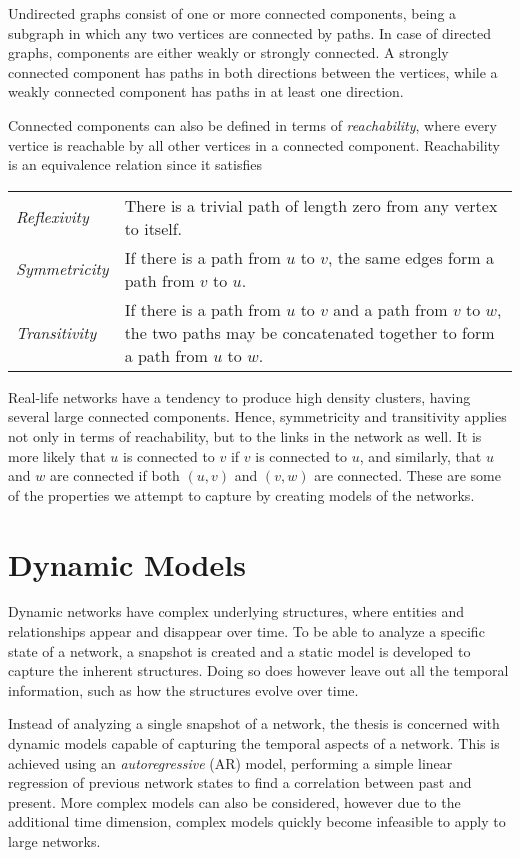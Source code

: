     Undirected graphs consist of one or more connected components, being a subgraph in which any two vertices are connected by paths. 
    In case of directed graphs, components are either weakly or strongly connected. A strongly connected component has paths in both directions between the vertices, while a weakly connected component has paths in at least one direction. 
    
    Connected components can also be defined in terms of \emph{reachability}, where every vertice is reachable by all other vertices in a connected component. Reachability is an equivalence relation since it satisfies
    \par\begin{tabular}{>{\itshape}l p{}}
        Reflexivity  & There is a trivial path of length zero from any vertex to itself. \\
        Symmetricity & If there is a path from $u$ to $v$, the same edges form a path from $v$ to $u$. \\
        Transitivity & If there is a path from $u$ to $v$ and a path from $v$ to $w$, the two paths may be concatenated together to form a path from $u$ to $w$.
    \end{tabular}
    
    Real-life networks have a tendency to produce high density clusters, having several large connected components. Hence, symmetricity and transitivity applies not only in terms of reachability, but to the links in the network as well. It is more likely that $u$ is connected to $v$ if $v$ is connected to $u$, and similarly, that $u$ and $w$ are connected if both $(u,v)$ and $(v,w)$ are connected. These are some of the properties we attempt to capture by creating models of the networks.

\section{Dynamic Models}

    Dynamic networks have complex underlying structures, where entities and relationships appear and disappear over time. To be able to analyze a specific state of a network, a snapshot is created and a static model is developed to capture the inherent structures.
    Doing so does however leave out all the temporal information, such as how the structures evolve over time.
    
    Instead of analyzing a single snapshot of a network, the thesis is concerned with dynamic models capable of capturing the temporal aspects of a network. This is achieved using an \emph{autoregressive} (AR) model, performing a simple linear regression of previous network states to find a correlation between past and present. More complex models can also be considered, however due to the additional time dimension, complex models quickly become infeasible to apply to large networks.
    
